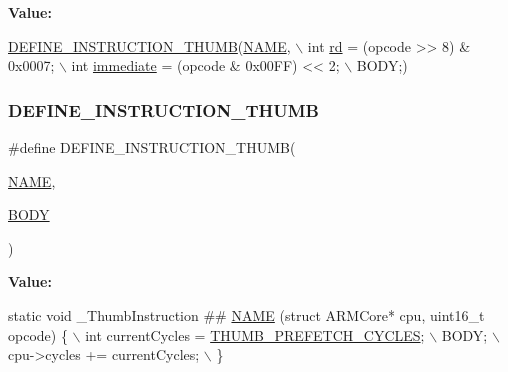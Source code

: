 {\bfseries Value\+:}
\begin{DoxyCode}
\mbox{\hyperlink{isa-thumb_8c_aca0a4c9b536fe9f14f89105945cfeb3d}{DEFINE\_INSTRUCTION\_THUMB}}(\mbox{\hyperlink{inflate_8h_a164ea0159d5f0b5f12a646f25f99eceaa67bc2ced260a8e43805d2480a785d312}{NAME}}, \(\backslash\)
        \textcolor{keywordtype}{int} \mbox{\hyperlink{isa-arm_8c_a555541ce18ed9b5fad657a06b22cb465}{rd}} = (opcode >> 8) & 0x0007; \(\backslash\)
        int \mbox{\hyperlink{decoder-arm_8c_a8bc2501cb64b3bc9ac59754cfafb68d1}{immediate}} = (opcode & 0x00FF) << 2; \(\backslash\)
        BODY;)
\end{DoxyCode}
\mbox{\label{isa-thumb_8c_aca0a4c9b536fe9f14f89105945cfeb3d}} 
\subsubsection{\texorpdfstring{D\+E\+F\+I\+N\+E\+\_\+\+I\+N\+S\+T\+R\+U\+C\+T\+I\+O\+N\+\_\+\+T\+H\+U\+MB}{DEFINE\_INSTRUCTION\_THUMB}}
{\footnotesize\ttfamily \#define D\+E\+F\+I\+N\+E\+\_\+\+I\+N\+S\+T\+R\+U\+C\+T\+I\+O\+N\+\_\+\+T\+H\+U\+MB(\begin{DoxyParamCaption}\item[{}]{\mbox{\hyperlink{inflate_8h_a164ea0159d5f0b5f12a646f25f99eceaa67bc2ced260a8e43805d2480a785d312}{N\+A\+ME}},  }\item[{}]{\mbox{\hyperlink{gzlog_8c_aa6bdf6a6d9916c343e1e17774d84a156}{B\+O\+DY}} }\end{DoxyParamCaption})}

{\bfseries Value\+:}
\begin{DoxyCode}
\textcolor{keyword}{static} \textcolor{keywordtype}{void} \_ThumbInstruction ## \mbox{\hyperlink{inflate_8h_a164ea0159d5f0b5f12a646f25f99eceaa67bc2ced260a8e43805d2480a785d312}{NAME}} (\textcolor{keyword}{struct} ARMCore* cpu, uint16\_t opcode) \{  \(\backslash\)
        int currentCycles = \mbox{\hyperlink{isa-thumb_8c_a85b1271971728be0c5ad770f9fb34d32}{THUMB\_PREFETCH\_CYCLES}}; \(\backslash\)
        BODY; \(\backslash\)
        cpu->cycles += currentCycles; \(\backslash\)
    \}
\end{DoxyCode}
\mbox{\label{isa-thumb_8c_ab899da842835d2ec664c1a915eee22e1}} 
